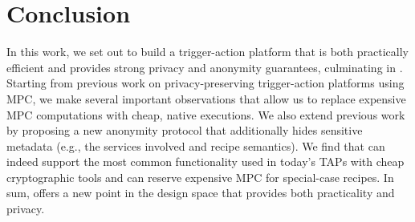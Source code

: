 \section{Conclusion}
\label{sec:conclusion}

In this work, we set out to build a trigger-action platform that is both
practically efficient and provides strong privacy and anonymity guarantees,
culminating in \sys. Starting from previous work on privacy-preserving
trigger-action platforms using MPC, we make several important observations that
allow us to replace expensive MPC computations with cheap, native executions. We
also extend previous work by proposing a new anonymity protocol that
additionally hides sensitive metadata (e.g., the services involved and recipe
semantics). We find that \sys can indeed support the most common functionality
used in today's TAPs with cheap cryptographic tools and can reserve expensive
MPC for special-case recipes. In sum, \sys offers a new point in the design
space that provides both practicality and privacy.

%
